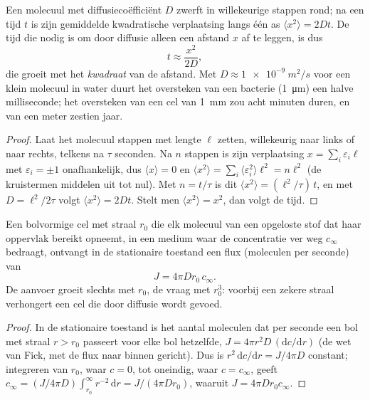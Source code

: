 \begin{theorem}\label{thm:b2:unicellular-diversity:diffusion}
Een molecuul met diffusiecoëfficiënt $D$ zwerft in willekeurige
stappen rond; na een tijd $t$ is zijn gemiddelde kwadratische
verplaatsing langs één as $\langle x^2\rangle = 2Dt$. De tijd die
nodig is om door diffusie alleen een afstand $x$ af te leggen, is dus
\[
t \approx \frac{x^2}{2D},
\]
die groeit met het \emph{kwadraat} van de afstand. Met
$D \approx \qty{1e-9}{m^2/s}$ voor een klein molecuul in water duurt
het oversteken van een bacterie (\qty{1}{\micro m}) een halve
milliseconde; het oversteken van een cel van \qty{1}{mm} zou acht
minuten duren, en van een meter zestien jaar.
\end{theorem}
\begin{proof}
Laat het molecuul stappen met lengte $\ell$ zetten, willekeurig naar
links of naar rechts, telkens na $\tau$ seconden. Na $n$ stappen is zijn
verplaatsing $x = \sum_i \varepsilon_i \ell$ met $\varepsilon_i = \pm 1$
onafhankelijk, dus $\langle x\rangle = 0$ en $\langle x^2\rangle =
\sum_i \langle\varepsilon_i^2\rangle \ell^2 = n\ell^2$ (de
kruistermen middelen uit tot nul). Met $n = t/\tau$ is dit $\langle x^2\rangle
= (\ell^2/\tau)\,t$, en met $D = \ell^2/2\tau$ volgt
$\langle x^2\rangle = 2Dt$. Stelt men $\langle x^2\rangle = x^2$, dan
volgt de tijd.
\end{proof}

\begin{theorem}\label{thm:b2:unicellular-diversity:supply}
Een bolvormige cel met straal $r_0$ die elk molecuul van een opgeloste
stof dat haar oppervlak bereikt opneemt, in een medium waar de
concentratie ver weg $c_\infty$ bedraagt, ontvangt in de stationaire
toestand een flux (moleculen per seconde) van
\[
J = 4\pi D r_0\, c_\infty .
\]
De aanvoer groeit slechts met $r_0$, de vraag met
$r_0^3$: voorbij een zekere straal verhongert een cel die door diffusie wordt gevoed.
\end{theorem}
\begin{proof}
In de stationaire toestand is het aantal moleculen dat per seconde
een bol met straal $r > r_0$ passeert voor elke bol hetzelfde, $J = 4\pi r^2 D\,
(\mathrm{d}c/\mathrm{d}r)$ (de wet van Fick, met de flux naar binnen
gericht). Dus is $r^2\,\mathrm{d}c/\mathrm{d}r = J/4\pi D$ constant;
integreren van $r_0$, waar $c = 0$, tot oneindig, waar $c = c_\infty$, geeft
$c_\infty = (J/4\pi D)\int_{r_0}^{\infty} r^{-2}\,\mathrm{d}r =
J/(4\pi D r_0)$, waaruit $J = 4\pi D r_0 c_\infty$.
\end{proof}

